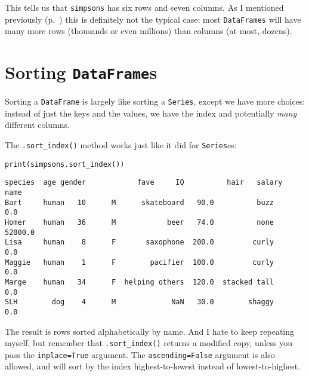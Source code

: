 This tells us that \texttt{simpsons} has six rows and seven columns. As I
mentioned previously (p.~\pageref{tallAndSkinny}) this is definitely not the
typical case: most \texttt{DataFrames} will have many more rows (thousands or
even millions) than columns (at most, dozens).

\section{Sorting \texttt{DataFrame}s}

Sorting a \texttt{DataFrame} is largely like sorting a \texttt{Series}, except
we have more choices: instead of just the keys and the values, we have the
index and potentially \textit{many} different columns.

The \texttt{.sort\_index()} method works just like it did for
\texttt{Series}es:

\begin{samepage}
\begin{Verbatim}[fontsize=\small,samepage=true,frame=single,framesep=3mm]
print(simpsons.sort_index())
\end{Verbatim}
\vspace{-.2in}

\begin{Verbatim}[fontsize=\scriptsize,samepage=true,frame=leftline,framesep=5mm,framerule=1mm]
       species  age gender            fave     IQ          hair   salary
name                                                                    
Bart     human   10      M      skateboard   90.0          buzz      0.0
Homer    human   36      M            beer   74.0          none  52000.0
Lisa     human    8      F       saxophone  200.0         curly      0.0
Maggie   human    1      F        pacifier  100.0         curly      0.0
Marge    human   34      F  helping others  120.0  stacked tall      0.0
SLH        dog    4      M             NaN   30.0        shaggy      0.0
\end{Verbatim}
\end{samepage}

The result is rows sorted alphabetically by name. And I hate to keep repeating
myself, but remember that \texttt{.sort\_index()} returns a modified copy,
unless you pass the \texttt{inplace=True} argument. The
\texttt{ascending=False} argument is also allowed, and will sort by the index
highest-to-lowest instead of lowest-to-highest.

